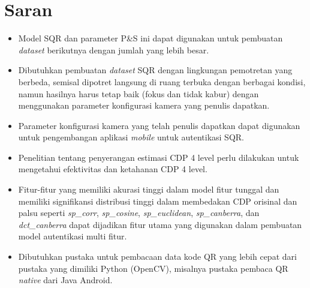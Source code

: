 \section{Saran}
\begin{itemize}
      \item Model SQR dan parameter P\&S ini dapat digunakan untuk pembuatan \emph{dataset} berikutnya dengan jumlah yang lebih besar.
      \item Dibutuhkan pembuatan \emph{dataset} SQR dengan lingkungan pemotretan yang berbeda, semisal dipotret langsung di ruang terbuka dengan berbagai kondisi, namun
            hasilnya harus tetap baik (fokus dan tidak kabur) dengan menggunakan parameter konfigurasi kamera yang penulis dapatkan.
      \item Parameter konfigurasi kamera yang telah penulis dapatkan dapat digunakan untuk pengembangan aplikasi \emph{mobile} untuk autentikasi SQR.
      \item Penelitian tentang penyerangan estimasi CDP 4 level perlu dilakukan untuk mengetahui efektivitas dan ketahanan CDP 4 level.
      \item Fitur-fitur yang memiliki akurasi tinggi dalam model fitur tunggal dan memiliki signifikansi distribusi tinggi dalam membedakan CDP orisinal dan palsu seperti
            \emph{sp\_corr}, \emph{sp\_cosine}, \emph{sp\_euclidean}, \emph{sp\_canberra}, dan \emph{dct\_canberra} dapat dijadikan fitur utama yang digunakan dalam
            pembuatan model autentikasi multi fitur.
      \item Dibutuhkan pustaka untuk pembacaan data kode QR yang lebih cepat dari pustaka yang dimiliki Python (OpenCV), misalnya pustaka pembaca QR \emph{native} dari
            Java Android.
\end{itemize}